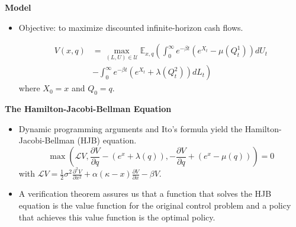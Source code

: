 \documentclass{beamer}
\begin{document}
\begin{frame}
{\bf Model}
\begin{itemize}
  \item Objective: to maximize discounted infinite-horizon cash flows.

  \begin{equation}
  \begin{split}
  V(x,q) &= \max_{(L,U) \in \mathcal{U}} \mathbb{E}_{x,q} \left(\int_{0}^{\infty} e^{-\beta t}(e^{X_t} - \mu(Q^1_t))dU_t\right.\\
  &\left.- \int_{0}^{\infty}e^{-\beta t}(e^{X_t} + \lambda(Q^2_t))dL_t\right)
  \end{split}
\end{equation}
where $X_0 =x$ and $Q_0 = q$. %
%
  
\end{itemize}
\end{frame}

\begin{frame}
{\bf The Hamilton-Jacobi-Bellman Equation}
\begin{itemize}
  \item Dynamic programming arguments and Ito's formula yield the Hamilton-Jacobi-Bellman (HJB) equation.
  \begin{equation*}
  \max\left( \mathcal{L} V, \frac{\partial V}{\partial q} - (e^x + \lambda(q)), -\frac{\partial V}{\partial q} + (e^x - \mu(q))\right) = 0
\end{equation*}
with $\mathcal{L}V = \frac{1}{2} \sigma^2 \frac{\partial^2 V}{\partial x^2} + \alpha (\kappa - x) \frac{\partial V}{\partial x} - \beta V$.


  \item A verification theorem assures us that a function that solves the HJB equation is the value function for the original control problem and a policy that achieves this value function is the optimal policy.

\end{itemize}

\end{frame}
\end{document}
